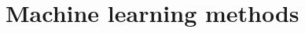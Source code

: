 
\section{Machine learning methods}%
\label{sec:ml-methods}



\pagebreak

\pagebreak

\pagebreak

\pagebreak

